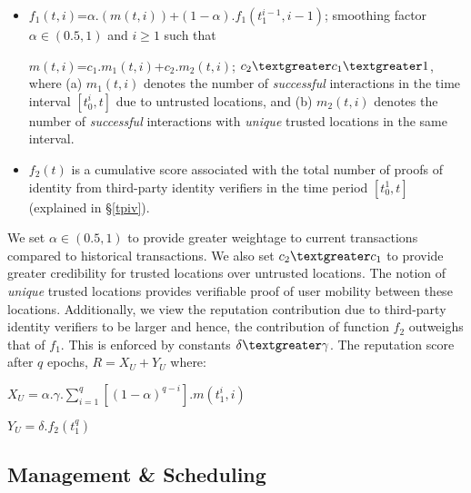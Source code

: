 \documentclass[letterpaper,twocolumn]{sig-alternate}
\begin{document}
\vspace{1mm}
\begin{itemize}[leftmargin=-.01in]
\itemsep-0.23em 
\item $f_1(t,i)$=$\alpha.(m(t,i))$+$(1-\alpha) .f_1(t^{i-1}_1,i-1)$; smoothing factor $\alpha \in (0.5,1)$ and $i \ge 1$ such that

$m(t,i)$=$c_1.m_1(t,i)$+$c_2.m_2(t,i)$; $c_2 \textgreater c_1 \textgreater 1$, where (a) $m_1(t,i)$ denotes the number of \textit{successful} interactions in the time interval $[t^i_{0},t]$ due to untrusted locations, and (b) $m_2(t,i)$ denotes the number of \textit{successful} interactions with \textit{unique} trusted locations in the same interval. 

\item $f_2(t)$ is a cumulative score associated with the total number of proofs of identity from third-party identity verifiers in the time period $[t^1_{0},t]$ (explained in \S \ref{tpiv}). 

\end{itemize}
\vspace{-2mm}

We set $\alpha \in (0.5,1)$ to provide greater weightage to current transactions compared to historical transactions. We also set $c_2\textgreater c_1$ to provide greater credibility for trusted locations over untrusted locations. The notion of {\em unique} trusted locations provides verifiable proof of user mobility between these locations. Additionally, we view the reputation contribution due to third-party identity verifiers to be larger and hence, the contribution of function $f_2$ outweighs that of $f_1$. This is enforced by constants $\delta \textgreater \gamma$. 
The reputation score after $q$ epochs, $R=X_U + Y_U$ where:

\vspace{2mm}

{\large \centerline{\textbf{$X_U = \alpha.\gamma.\sum_{i=1}^q [(1-\alpha)^{q-i}].m(t^i_1,i)$}}}

\vspace{2mm}

{\large \centerline{\textbf{$Y_U = \delta.f_2(t^q_1)$}}}

\vspace{3mm}



\subsection{Management \& Scheduling}
\label{manager}
\end{document}
